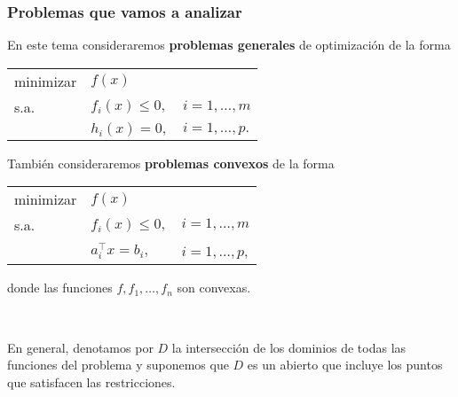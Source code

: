 \documentclass{beamer}
\begin{document}
\begin{frame}
\frametitle{Problemas que vamos a analizar}


En este tema consideraremos \textbf{problemas generales} de optimización de la forma

\begin{center}
\begin{tabular}{lll}
minimizar & $f(x)$ \\
s.a. & $f_i(x)\leq 0,$  &  $i=1,\ldots,m$ \\
	 & $h_i(x) = 0,$  &  $i=1,\ldots,p.$
\end{tabular}
\end{center}

También consideraremos  \textbf{problemas convexos} de la forma

\begin{center}
\begin{tabular}{lll}
minimizar & $f(x)$ & \\
s.a. & $f_i(x)\leq 0,$  &  $i=1,\ldots,m$ \\
	 & $a^\top_i x = b_i,$  &  $i=1,\ldots,p$,
\end{tabular}
\end{center}
donde las funciones $f,f_1,\ldots, f_n$ son convexas. 



\

En general, denotamos por $D$ la intersección de los dominios de todas las funciones del problema y suponemos que $D$ es un abierto que incluye los puntos que satisfacen las restricciones.

\end{frame}
\end{document}
